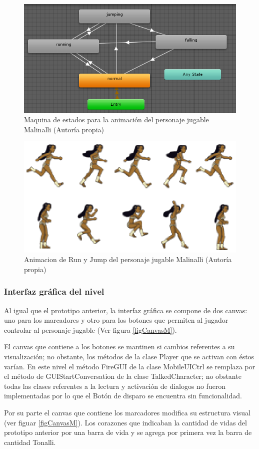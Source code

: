 \begin{figure}
  \centering
   \includegraphics[width=0.4 \textwidth]{05TrabajoRealizado/03Unity/imagenes/03MaquinaEstadosMalinalli}
  \caption{Maquina de estados para la animación del personaje jugable Malinalli (Autoría propia)}
  \label{figMaqMalinalli}
\end{figure}

\begin{figure}
  \centering
   \includegraphics[width=0.4 \textwidth]{05TrabajoRealizado/03Unity/imagenes/bloquesanimacionMalinalli}
  \caption{Animacion de Run y Jump del personaje jugable Malinalli (Autoría propia)}
  \label{figAniMalinalli}
\end{figure}

\subsubsection{Interfaz gráfica del nivel}
Al igual que el prototipo anterior, la interfaz gráfica se compone de dos canvas: uno 
para los marcadores y otro para los botones que permiten al jugador controlar al personaje jugable (Ver figura \ref{figCanvasM}).
\\
\par
El canvas que contiene a los botones se mantinen si cambios referentes a su 
visualización; no obstante, los métodos de la clase Player que se activan con 
éstos varían. En este nivel el método FireGUI de la clase MobileUICtrl se 
remplaza por el método de GUIStartConversation de la clase TalkedCharacter; no 
obstante todas las clases referentes a la lectura y activación de dialogos no 
fueron implementadas por lo que el Botón de disparo se encuentra sin funcionalidad.
\\
\par
Por su parte el canvas que contiene los marcadores modifica su estructura visual (ver 
figuar \ref{figCanvasM}). Los corazones que indicaban la cantidad de vidas del 
prototipo anterior por una barra de vida y se agrega por primera vez la  
barra de cantidad Tonalli.   

